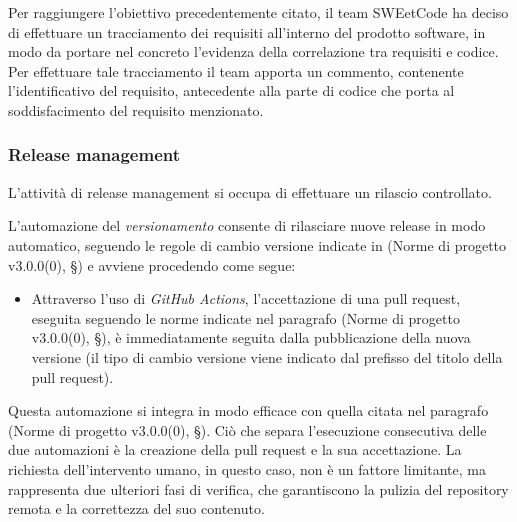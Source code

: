 \documentclass[10pt, a4paper]{article}
\begin{document}
Per raggiungere l'obiettivo precedentemente citato, il team SWEetCode ha deciso di effettuare un tracciamento dei requisiti all'interno del prodotto software,
in modo da portare nel concreto l'evidenza della correlazione tra requisiti e codice.\\
Per effettuare tale tracciamento il team apporta un commento, contenente l'identificativo del requisito, antecedente alla parte di codice che porta al soddisfacimento
del requisito menzionato.

\subsubsection{Release management}
L'attività di release management si occupa di effettuare un rilascio controllato.

L'automazione del \textit{versionamento\pg} consente di rilasciare nuove release in modo automatico, seguendo le regole di
cambio versione indicate in (Norme di progetto v3.0.0(0), \S {}) e avviene procedendo come segue:
\begin{itemize}
    \item Attraverso l'uso di \textit{GitHub Actions\pg}, l'accettazione di una pull request, 
    eseguita seguendo le norme indicate nel paragrafo (Norme di progetto v3.0.0(0), \S {}), è immediatamente seguita dalla pubblicazione della nuova versione (il tipo di cambio versione viene indicato dal prefisso del titolo della pull request).
\end{itemize}
Questa automazione si integra in modo efficace con quella citata nel paragrafo (Norme di progetto v3.0.0(0), \S {}).
Ciò che separa l'esecuzione consecutiva delle due automazioni è la creazione della pull request e la sua accettazione.
La richiesta dell'intervento umano, in questo caso, non è un fattore limitante, ma rappresenta due ulteriori fasi di
verifica, che garantiscono la pulizia del repository remota e la correttezza del suo contenuto.
\end{document}
